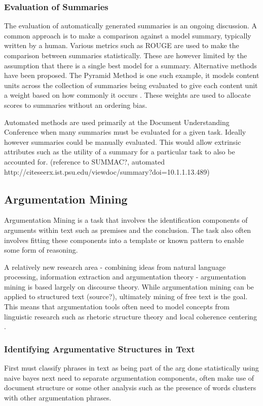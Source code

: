       \subsubsection{Evaluation of Summaries}
        The evaluation of automatically generated summaries is an ongoing discussion. A common approach is to make a comparison against a model summary, typically written by a human. Various metrics such as ROUGE \cite{lin2004rouge} are used to make the comparison between summaries statistically. These are however limited by the assumption that there is a single best model for a summary. Alternative methods have been proposed. The Pyramid Method is one such example, it models content units across the collection of summaries being evaluated to give each content unit a weight based on how commonly it occurs \cite{nenkova2004evaluating}. These weights are used to allocate scores to summaries without an ordering bias.

        Automated methods are used primarily at the Document Understanding Conference when many summaries must be evaluated for a given task. Ideally however summaries could be manually evaluated. This would allow extrinsic attributes such as the utility of a summary for a particular task to also be accounted for. (reference to SUMMAC?, automated http://citeseerx.ist.psu.edu/viewdoc/summary?doi=10.1.1.13.489)

    \subsection{Argumentation Mining}
      Argumentation Mining is a task that involves the identification components of arguments within text such as premises and the conclusion. The task also often involves fitting these components into a template or known pattern to enable some form of reasoning. \cite{palau2009argumentation}

      A relatively new research area - combining ideas from natural language processing, information extraction and argumentation theory - argumentation mining is based largely on discourse  theory. While argumentation mining can be applied to structured text (source?), ultimately mining of free text is the goal. This means that argumentation tools often need to model concepts from linguistic research such as rhetoric structure theory \cite{mann1988rhetorical} and local coherence centering \cite{weinstein21centering}.

      \subsubsection{Identifying Argumentative Structures in Text}
        First must classify phrases in text as being part of the arg
        done statistically using naive bayes
        next need to separate argumentation components, often make use of document structure or some other analysis such as the presence of words clusters with other argumentation phrases.

